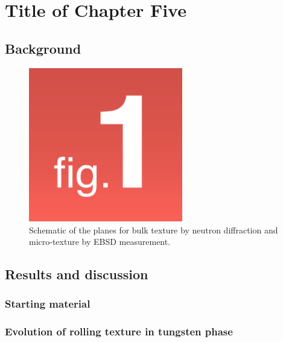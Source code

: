 
\chapter{Title of Chapter Five}

\label{Chapter5} %


\section{Background}

\lipsum[2-4]

\begin{figure}
    \centering
    \includegraphics[width=0.6\textwidth]{Pictures/Figure 1.png}
    \caption{Schematic of the planes for bulk texture by neutron diffraction and micro-texture by EBSD measurement.}
    \label{fig:Chap5Fig1}
\end{figure}


\section{Results and discussion}

\subsection{Starting material}

\lipsum[1-2]

\subsection{Evolution of rolling texture in tungsten phase}

